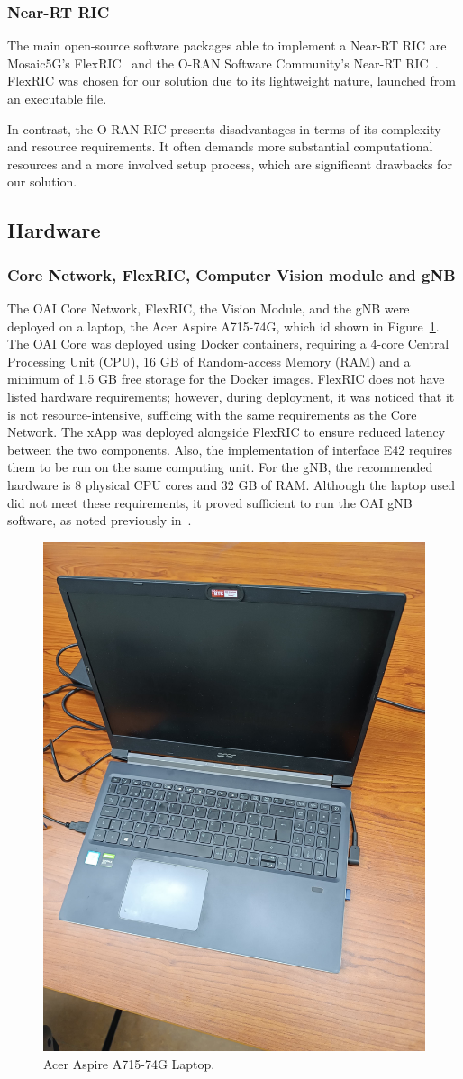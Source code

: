 \subsubsection{Near-RT RIC}
The main open-source software packages able to implement a Near-RT RIC are Mosaic5G’s FlexRIC~\cite{flexric} and the O-RAN Software Community’s Near-RT RIC~\cite{oran-sc}.
FlexRIC was chosen for our solution due to its lightweight nature, launched from an executable file.

In contrast, the O-RAN RIC presents disadvantages in terms of its complexity and resource requirements.
It often demands more substantial computational resources and a more involved setup process, which are significant drawbacks for our solution.

\subsection{Hardware}\label{subsec:hardware}


\subsubsection{Core Network, FlexRIC, Computer Vision module and gNB}
The OAI Core Network, FlexRIC, the Vision Module, and the gNB were deployed on a laptop, the Acer Aspire A715-74G, which id shown in Figure~\ref{fig:computer_acer}.
The OAI Core was deployed using Docker containers, requiring a 4-core Central Processing Unit (CPU), 16 GB of Random-access Memory (RAM) and a minimum of 1.5 GB free storage for the Docker images.
FlexRIC does not have listed hardware requirements; however, during deployment, it was noticed that it is not resource-intensive, sufficing with the same requirements as the Core Network.
The xApp was deployed alongside FlexRIC to ensure reduced latency between the two components.
Also,  the implementation of interface E42 requires them to be run on the same computing unit.
For the gNB, the recommended hardware is 8 physical CPU cores and 32 GB of RAM\@.
Although the laptop used did not meet these requirements, it proved sufficient to run the OAI gNB software, as noted previously in~\cite{queiros2023autonomous}.

\begin{figure}[H]
    \centering
    \includegraphics[width=0.3\linewidth]{figures/acer}
    \caption{Acer Aspire A715-74G Laptop.}
    \label{fig:computer_acer}
\end{figure}


